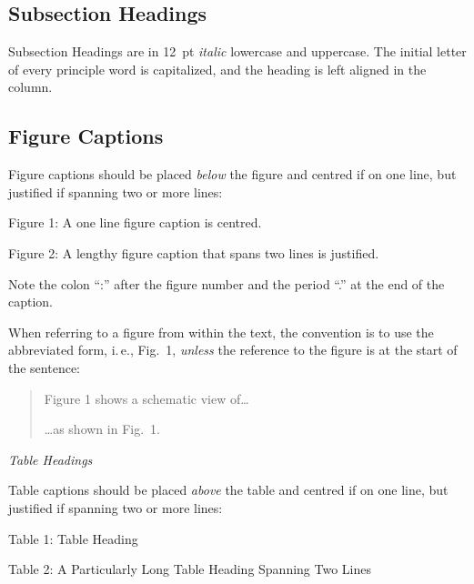 \subsection{Subsection Headings}

Subsection Headings are in \SI{12}{pt} \emph{italic} lowercase and uppercase.
The initial letter of every principle word is capitalized,
and the heading is left aligned in the column.

\subsection{Figure Captions}

Figure captions should be placed \emph{below} the figure and
centred if on one line, but justified if spanning two or
more lines:
\begin{center}
	Figure 1: A one line figure caption is centred.
\end{center}
\begin{justify}
	Figure 2: A lengthy figure caption that spans
	two lines is justified.
\end{justify}
Note the colon “:” after the figure number and the period
“.” at the end of the caption.

When referring to a figure from within the text, the
convention is to use the abbreviated form, i.\,e., Fig.~1,
\emph{unless} the reference to the figure is at the start of the sentence:
\begin{quote}
	Figure 1 shows a schematic view of\ldots
	
	\ldots as shown in Fig.~1.
\end{quote}

\iffalse
\subsection{Table Headings}
\else
\noindent\textit{\vspace{1em}\large Table Headings}
\fi

Table captions should be placed \emph{above} the table and
centred if on one line, but justified if spanning two or
more lines:
\begin{center}
	Table 1: Table Heading
\end{center}
\begin{justify}
	Table 2: A Particularly Long Table Heading
	Spanning Two Lines
\end{justify}

